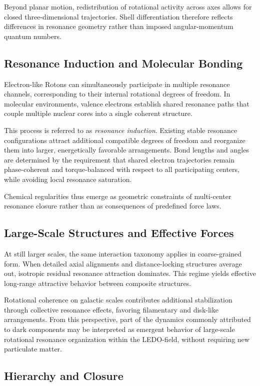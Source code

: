 \documentclass[11pt,a4paper]{article}
\begin{document}
Beyond planar motion, redistribution of rotational activity across axes allows for closed
three-dimensional trajectories.
Shell differentiation therefore reflects differences in resonance geometry rather than
imposed angular-momentum quantum numbers.

\subsection{Resonance Induction and Molecular Bonding}

Electron-like Rotons can simultaneously participate in multiple resonance channels,
corresponding to their internal rotational degrees of freedom.
In molecular environments, valence electrons establish shared resonance paths that couple
multiple nuclear cores into a single coherent structure.

This process is referred to as \emph{resonance induction}.
Existing stable resonance configurations attract additional compatible degrees of freedom
and reorganize them into larger, energetically favorable arrangements.
Bond lengths and angles are determined by the requirement that shared electron trajectories
remain phase-coherent and torque-balanced with respect to all participating centers, while
avoiding local resonance saturation.

Chemical regularities thus emerge as geometric constraints of multi-center resonance
closure rather than as consequences of predefined force laws.

\subsection{Large-Scale Structures and Effective Forces}

At still larger scales, the same interaction taxonomy applies in coarse-grained form.
When detailed axial alignments and distance-locking structures average out, isotropic
residual resonance attraction dominates.
This regime yields effective long-range attractive behavior between composite structures.

Rotational coherence on galactic scales contributes additional stabilization through
collective resonance effects, favoring filamentary and disk-like arrangements.
From this perspective, part of the dynamics commonly attributed to dark components may be
interpreted as emergent behavior of large-scale rotational resonance organization within
the LEDO-field, without requiring new particulate matter.

\subsection{Hierarchy and Closure}
\end{document}
